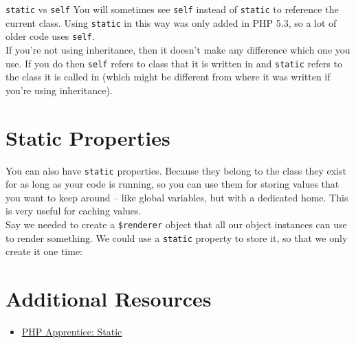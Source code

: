 
\begin{infobox}{\texttt{static} vs \texttt{self}}
    You will sometimes see \texttt{self} instead of \texttt{static} to reference the current class. Using \texttt{static} in this way was only added in PHP 5.3, so a lot of older code uses \texttt{self}.
    \\

    If you're not using inheritance, then it doesn't make any difference which one you use. If you do then \texttt{self} refers to class that it is written in and \texttt{static} refers to the class it is called in (which might be different from where it was written if you're using inheritance).
\end{infobox}


\section{Static Properties}

You can also have \texttt{static} properties. Because they belong to the class they exist for as long as your code is running, so you can use them for storing values that you want to keep around – like global variables, but with a dedicated home. This is very useful for caching values.
\\

Say we needed to create a \texttt{\$renderer} object that all our object instances can use to render\textellipsis{} something. We could use a \texttt{static} property to store it, so that we only create it one time:



\section{Additional Resources}

\begin{itemize}[leftmargin=*]
    \item \href{https://phpapprentice.com/static.html}{PHP Apprentice: Static}
\end{itemize}
